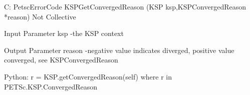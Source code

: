 C:
PetscErrorCode KSPGetConvergedReason
   (KSP ksp,KSPConvergedReason *reason)
Not Collective

Input Parameter
ksp -the KSP context

Output Parameter
reason -negative value indicates diverged, positive value converged,
see KSPConvergedReason 

Python:
r = KSP.getConvergedReason(self)
where r in PETSc.KSP.ConvergedReason
